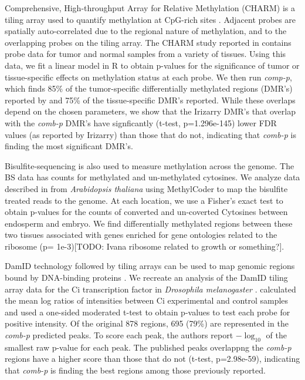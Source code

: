 \documentclass{bioinfo}
\begin{document}
\begin{methods}
Comprehensive, High-throughput Array for Relative Methylation (CHARM)
is a tiling array used to quantify methylation at CpG-rich sites
\citep{Irizarry2008}.  Adjacent probes are spatially auto-correlated
due to the regional nature of methylation, and to the overlapping
probes on the tiling array.  The CHARM study reported in
\cite{Irizarry2009} contains probe data for tumor and normal samples
from a variety of tissues. Using this data, we fit a linear model in R
\citep{R} to
obtain p-values for the significance of tumor or tissue-specific
effects on methylation status at each probe.  We then run
\textit{comp-p}, which finds 85\% of the tumor-specific differentially
methylated regions (DMR's) reported by \cite{Irizarry2009} and 75\% of
the tissue-specific DMR's reported.  While these overlaps depend on
the chosen parameters, we show that the Irizarry DMR's that overlap
with the \textit{comb-p} DMR's have signficantly (t-test,
p=1.296e-145) lower FDR values (as reported by Irizarry) than those
that do not, indicating that \textit{comb-p} is finding the most
significant DMR's.

Bisulfite-sequencing is also used to measure methylation across the
genome. The BS data
has counts for methylated and un-methylated cytosines.  We
analyze data described in \cite{Hsieh2009} from {\it Arabidopsis
thaliana} using MethylCoder \citep{Pedersen2011} to map the
bisulfite treated reads to the genome. At each location,
we use a Fisher's exact test to obtain p-values for the counts of
converted and un-coverted Cytosines between endosperm and embryo. We find
differentially methylated regions between these two tissues associated
with genes enriched for gene ontologies related to the ribosome (p=
1e-3)[TODO: Ivana ribosome related to growth or something?].

DamID technology followed by tiling arrays can be used to map genomic
regions bound by DNA-binding proteins \citep{Steensel2001}.  We
recreate an analysis of the DamID tiling array data for the Ci
transcription factor in {\it Drosophila melanogaster} \citep{Biehs}.
\cite{Kechris2010} calculated the
mean log ratios of intensities between Ci experimental and control
samples and used a one-sided moderated t-test \citep{Limma2005} to obtain
p-values to test each probe for positive intensity.
Of the original 878 regions, 695 (79\%) are
represented in the \textit{comb-p} predicted peaks.  To score each
peak, the authors report $-\log_{10}$ of the smallest raw p-value for
each peak. The published peaks overlappng the \textit{comb-p} regions
have a higher score than those that do not (t-test, p=2.98e-59),
indicating that \textit{comb-p}
is finding the best regions among those previously reported.

\end{methods}
\end{document}
